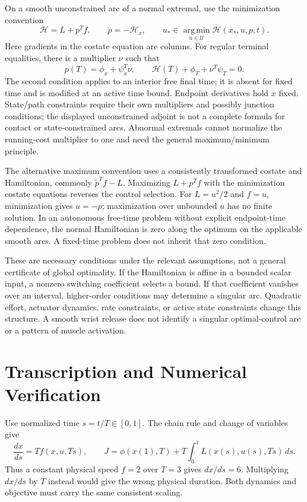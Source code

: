 On a smooth unconstrained arc of a normal extremal, use the minimization
convention
\begin{equation}\label{eq:ocp_hamiltonian}
 \mathcal H=L+p^Tf,\qquad
 \dot p=-\mathcal H_x,\qquad
 u_*\in\operatorname*{arg\,min}_{u\in\mathcal U}\mathcal H(x_*,u,p,t).
\end{equation}
Here gradients in the costate equation are columns. For regular terminal
equalities, there is a multiplier $\nu$ such that
\begin{equation}\label{eq:ocp_transversality}
 p(T)=\phi_x+\psi_x^T\nu,\qquad
 \mathcal H(T)+\phi_T+\nu^T\psi_T=0.
\end{equation}
The second condition applies to an interior free final time; it is absent
for fixed time and is modified at an active time bound. Endpoint derivatives
hold $x$ fixed. State/path constraints require their own multipliers and
possibly junction conditions; the displayed unconstrained adjoint is not a
complete formula for contact or state-constrained arcs. Abnormal extremals
cannot normalize the running-cost multiplier to one and need the general
maximum/minimum principle.

The alternative maximum convention uses a consistently transformed costate
and Hamiltonian, commonly $\tilde p^Tf-L$. Maximizing $L+p^Tf$ with the
minimization costate equations reverses the control selection. For
$L=u^2/2$ and $f=u$, minimization gives $u=-p$; maximization over unbounded
$u$ has no finite solution. In an autonomous free-time problem without
explicit endpoint-time dependence, the normal Hamiltonian is zero along
the optimum on the applicable smooth arcs. A fixed-time problem does not
inherit that zero condition.

These are necessary conditions under the relevant assumptions, not a general
certificate of global optimality. If the Hamiltonian is affine in a bounded
scalar input, a nonzero switching coefficient selects a bound. If that
coefficient vanishes over an interval, higher-order conditions may determine
a singular arc. Quadratic effort, actuator dynamics, rate constraints, or
active state constraints change this structure. A smooth wrist release does
not identify a singular optimal-control arc or a pattern of muscle activation.

\section{Transcription and Numerical Verification}

Use normalized time $s=t/T\in[0,1]$. The chain rule and change of variables give
\begin{equation}\label{eq:normalized_ocp}
 \frac{dx}{ds}=T f(x,u,Ts),\qquad
 J=\phi(x(1),T)+T\int_0^1 L(x(s),u(s),Ts)\,ds.
\end{equation}
Thus a constant physical speed $f=2$ over $T=3$ gives $dx/ds=6$.
Multiplying $dx/ds$ by $T$ instead would give the wrong physical duration.
Both dynamics and objective must carry the same consistent scaling.


